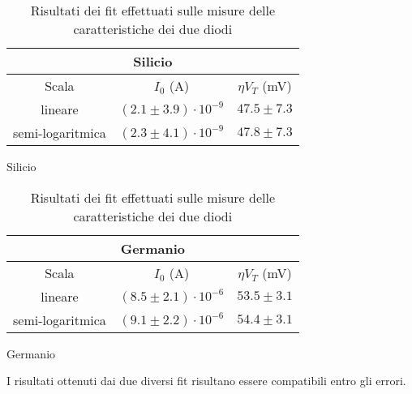 \documentclass[@SRC@/main]{subfiles}
\begin{document}
    \begin{table}[h]
      \centering
      \begin{subtable}{.45\textwidth}
        \centering
        \begin{tabular}{||c|c|c||}
          \hline
          \multicolumn{3}{||c||}{Silicio} \\
          \hline
          Scala            & $I_0$ (\textnormal{A})         & $\eta V_T$ (\textnormal{mV}) \\
          \hline
          lineare          & $(2.1\pm3.9)\cdot 10^{-9}$ & $47.5\pm7.3$    \\
          \hline
          semi-logaritmica & $(2.3 \pm 4.1)\cdot 10^{-9}$ & $47.8\pm 7.3$   \\
          \hline
        \end{tabular}
        \caption{Silicio}
        \label{tab:fit-silicio}
      \end{subtable}
      \hfill
      \begin{subtable}{.45\textwidth}
        \centering
        \begin{tabular}{||c|c|c||}
          \hline
          \multicolumn{3}{||c||}{Germanio} \\
          \hline
          Scala            & $I_0$ (\textnormal{A})           & $\eta V_T $ (\textnormal{mV}) \\
          \hline
          lineare          & $(8.5\pm2.1) \cdot 10^{-6}$ & $53.5\pm3.1$ \\
          \hline
          semi-logaritmica & $(9.1\pm 2.2) \cdot 10^{-6}$ & $54.4\pm3.1$   \\
          \hline
        \end{tabular}
        \caption{Germanio}
        \label{tab:fit-germanio}
      \end{subtable}
      \caption{Risultati dei fit effettuati sulle misure delle caratteristiche dei due diodi}
      \label{tab:fit-diodi}
    \end{table}

    \noindent I risultati ottenuti dai due diversi fit risultano essere compatibili entro gli errori.
\end{document}
